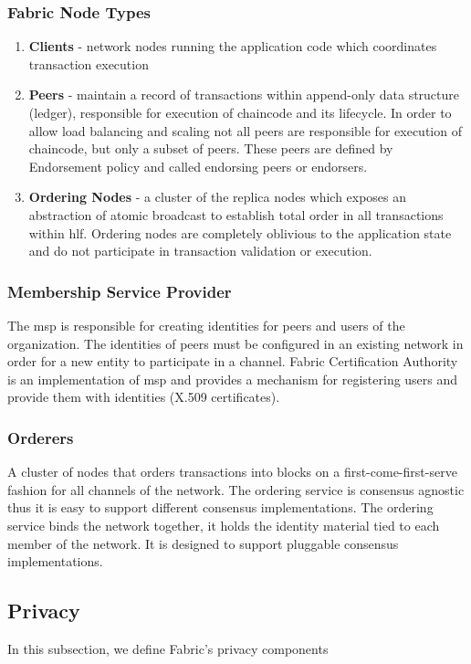 \subsubsection{Fabric Node Types}
\begin{enumerate}
\item \textbf{Clients} - network nodes running the application code which coordinates transaction execution
\item \textbf{Peers} - maintain a record of transactions within append-only data structure (ledger), responsible for execution of chaincode and its lifecycle. In order to allow load balancing and scaling not all peers are responsible for execution of chaincode, but only a subset of peers. These peers are defined by Endorsement policy and called endorsing peers or endorsers.
\item \textbf{Ordering Nodes} - a cluster of the replica nodes which exposes an abstraction of atomic broadcast to establish total order in all transactions within \acrshort{hlf}. Ordering nodes are completely oblivious to the application state and do not participate in transaction validation or execution.
\end{enumerate}
\subsubsection{Membership Service Provider}
\label{MSP}
The \acrshort{msp} is responsible for creating identities for peers and users of the organization. The identities of peers must be configured in an existing network in order for a new entity to participate in a channel. Fabric Certification Authority is an implementation of \acrshort{msp} and provides a mechanism for registering users and provide them with identities (X.509 certificates). 

\subsubsection{Orderers}
A cluster of nodes that orders transactions into blocks on a first-come-first-serve fashion for all channels of the network. The ordering service is consensus agnostic thus it is easy to support different consensus implementations. The ordering service binds the network together, it holds the identity material tied to each member of the network. It is designed to support pluggable consensus implementations. 

\subsection{Privacy}
In this subsection, we define Fabric's privacy components
